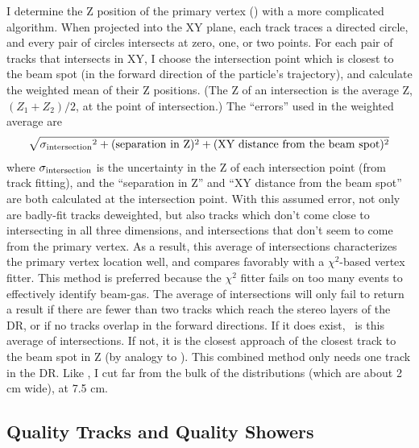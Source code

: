 I determine the Z position of the primary vertex (\dz) with a more
complicated algorithm.  When projected into the XY plane, each track
traces a directed circle, and every pair of circles intersects at
zero, one, or two points.  For each pair of tracks that intersects in
XY, I choose the intersection point which is closest to the beam spot
(in the forward direction of the particle's trajectory), and calculate
the weighted mean of their Z positions.  (The Z of an intersection is
the average Z, $(Z_1 + Z_2)/2$, at the point of intersection.)  The
``errors'' used in the weighted average are
\begin{equation}
  \sqrt{{\sigma_{\mbox{\scriptsize intersection}}}^2 + (\mbox{separation in
      Z})^2 + (\mbox{XY distance from the beam spot})^2}
\end{equation}
where $\sigma_{\mbox{\scriptsize intersection}}$ is the uncertainty in
the Z of each intersection point (from track fitting), and the
``separation in Z'' and ``XY distance from the beam spot'' are both
calculated at the intersection point.  With this assumed error, not
only are badly-fit tracks deweighted, but also tracks which don't come
close to intersecting in all three dimensions, and intersections that
don't seem to come from the primary vertex.  As a result, this average
of intersections characterizes the primary vertex location well, and
compares favorably with a $\chi^2$-based vertex fitter.  This method
is preferred because the $\chi^2$ fitter fails on too many events to
effectively identify beam-gas.  The average of intersections will only
fail to return a result if there are fewer than two tracks which reach
the stereo layers of the DR, or if no tracks overlap in the forward
directions.  If it does exist, \dz\ is this average of intersections.
If not, it is the closest approach of the closest track to the beam
spot in Z (by analogy to \dxy).  This combined method only needs one
track in the DR.  Like \dxy, I cut far from the bulk of the
distributions (which are about 2 cm wide), at 7.5 cm.

\subsection{Quality Tracks and Quality Showers}


